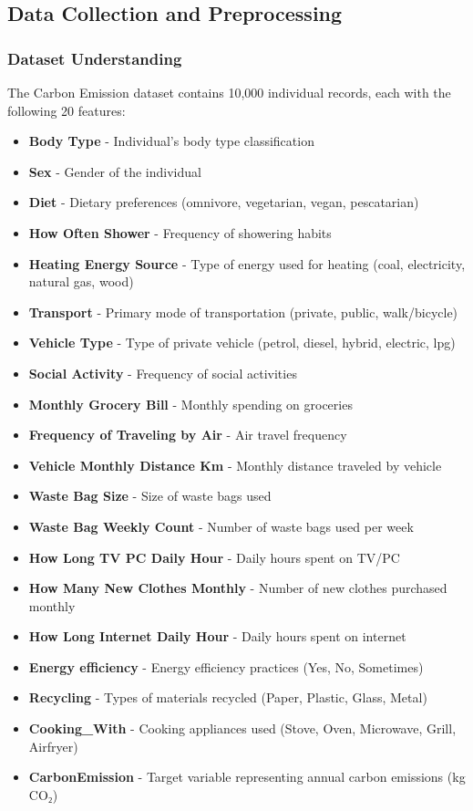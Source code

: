 \documentclass[12pt,a4paper]{article}
\begin{document}
\subsection{Data Collection and Preprocessing}

\subsubsection{Dataset Understanding}

The Carbon Emission dataset contains 10,000 individual records, each with the following 20 features:

\begin{itemize}
    \item \textbf{Body Type} - Individual's body type classification
    \item \textbf{Sex} - Gender of the individual
    \item \textbf{Diet} - Dietary preferences (omnivore, vegetarian, vegan, pescatarian)
    \item \textbf{How Often Shower} - Frequency of showering habits
    \item \textbf{Heating Energy Source} - Type of energy used for heating (coal, electricity, natural gas, wood)
    \item \textbf{Transport} - Primary mode of transportation (private, public, walk/bicycle)
    \item \textbf{Vehicle Type} - Type of private vehicle (petrol, diesel, hybrid, electric, lpg)
    \item \textbf{Social Activity} - Frequency of social activities
    \item \textbf{Monthly Grocery Bill} - Monthly spending on groceries
    \item \textbf{Frequency of Traveling by Air} - Air travel frequency
    \item \textbf{Vehicle Monthly Distance Km} - Monthly distance traveled by vehicle
    \item \textbf{Waste Bag Size} - Size of waste bags used
    \item \textbf{Waste Bag Weekly Count} - Number of waste bags used per week
    \item \textbf{How Long TV PC Daily Hour} - Daily hours spent on TV/PC
    \item \textbf{How Many New Clothes Monthly} - Number of new clothes purchased monthly
    \item \textbf{How Long Internet Daily Hour} - Daily hours spent on internet
    \item \textbf{Energy efficiency} - Energy efficiency practices (Yes, No, Sometimes)
    \item \textbf{Recycling} - Types of materials recycled (Paper, Plastic, Glass, Metal)
    \item \textbf{Cooking\_With} - Cooking appliances used (Stove, Oven, Microwave, Grill, Airfryer)
    \item \textbf{CarbonEmission} - Target variable representing annual carbon emissions (kg CO₂)
\end{itemize}
\end{document}
